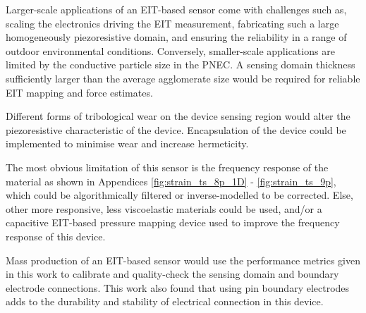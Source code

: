 Larger-scale applications of an EIT-based sensor come with challenges such as, scaling the electronics driving the EIT measurement, fabricating such a large homogeneously piezoresistive domain, and ensuring the reliability in a range of outdoor environmental conditions. Conversely, smaller-scale applications are limited by the conductive particle size in the PNEC. A sensing domain thickness sufficiently larger than the average agglomerate size would be required for reliable EIT mapping and force estimates.

Different forms of tribological wear on the device sensing region would alter the piezoresistive characteristic of the device. Encapsulation of the device could be implemented to minimise wear and increase hermeticity.

The most obvious limitation of this sensor is the frequency response of the material as shown in Appendices \ref{fig:strain_ts_8p_1D} - \ref{fig:strain_ts_9p}, which could be algorithmically filtered or inverse-modelled to be corrected. Else, other more responsive, less viscoelastic materials could be used, and/or a capacitive EIT-based pressure mapping device used to improve the frequency response of this device.

Mass production of an EIT-based sensor would use the performance metrics given in this work to calibrate and quality-check the sensing domain and boundary electrode connections. This work also found that using pin boundary electrodes adds to the durability and stability of electrical connection in this device.


